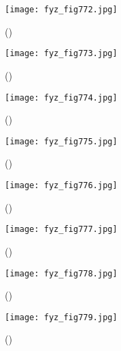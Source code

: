 {    \begin{figure}[ht!] %
      \centering
      \texttt{[image: fyz\_fig772.jpg]}
      \caption{
               (\cite[s.~707]{Feynman02})}
      \label{fyz_fig772}
    \end{figure}

    \begin{figure}[ht!] %
      \centering
      \texttt{[image: fyz\_fig773.jpg]}
      \caption{
               (\cite[s.~707]{Feynman02})}
      \label{fyz_fig773}
    \end{figure}

    \begin{figure}[ht!] %
      \centering
      \texttt{[image: fyz\_fig774.jpg]}
      \caption{
               (\cite[s.~707]{Feynman02})}
      \label{fyz_fig774}
    \end{figure}

    \begin{figure}[ht!] %
      \centering
      \texttt{[image: fyz\_fig775.jpg]}
      \caption{
               (\cite[s.~707]{Feynman02})}
      \label{fyz_fig775}
    \end{figure}

    \begin{figure}[ht!] %
      \centering
      \texttt{[image: fyz\_fig776.jpg]}
      \caption{
               (\cite[s.~707]{Feynman02})}
      \label{fyz_fig776}
    \end{figure}

    \begin{figure}[ht!] %
      \centering
      \texttt{[image: fyz\_fig777.jpg]}
      \caption{
               (\cite[s.~707]{Feynman02})}
      \label{fyz_fig777}
    \end{figure}

    \begin{figure}[ht!] %
      \centering
      \texttt{[image: fyz\_fig778.jpg]}
      \caption{
               (\cite[s.~707]{Feynman02})}
      \label{fyz_fig778}
    \end{figure}

    \begin{figure}[ht!] %
      \centering
      \texttt{[image: fyz\_fig779.jpg]}
      \caption{
               (\cite[s.~707]{Feynman02})}
      \label{fyz_fig779}
    \end{figure}

}
